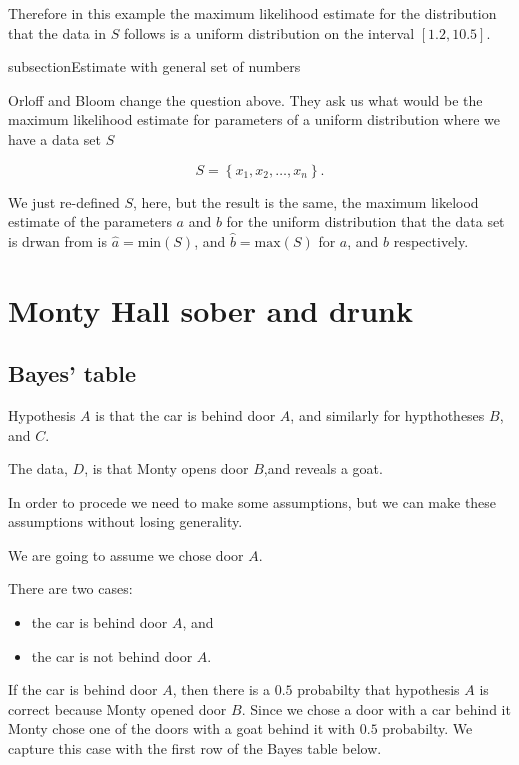 \documentclass[a5paper,11pt]{article}
\begin{document}
Therefore in this example the maximum likelihood estimate for the
distribution that the data in $S$ follows is a uniform distribution
on the interval $\left[ 1.2, 10.5 \right]$.

subsection{Estimate with general set of numbers}

Orloff and Bloom change the question above. They ask us what would be
the maximum likelihood estimate for parameters of a uniform distribution
where we have a data set $S$

\begin{equation}
S=\left\{x_1, x_2, \ldots, x_n \right\}.
\end{equation}

We just re-defined $S$, here, but the result is the same, the 
maximum likelood estimate of the parameters $a$ and $b$ for the
uniform distribution that the data set is drwan from is
$\hat{a} = \text{min}\left(S\right)$, and $\hat{b} =
\text{max}\left(S\right)$ for $a$, and $b$ respectively.

\section{Monty Hall sober and drunk}
\subsection{Bayes' table}
Hypothesis $A$ is that the car is behind door $A$,
and similarly for hypthotheses $B$, and $C$.

The data, $D$, is that Monty opens door $B$,and reveals a goat.

In order to procede we need to make
some assumptions, but we can make these
assumptions without losing generality.

We are going to assume we chose door $A$.

There are two cases:
\begin{itemize}
\item the car is behind door $A$, and
\item the car is not behind door $A$.
\end{itemize}

If the car is behind door $A$, then there
is a $0.5$ probabilty that hypothesis $A$
is correct because Monty opened door $B$.
Since we chose a door with a car behind
it Monty chose one of the doors with a 
goat behind it with $0.5$ probabilty.  We
capture this case with the first row of the
Bayes table below.
\end{document}
